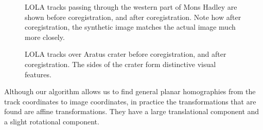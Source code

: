 \documentclass[float=false, crop=false]{standalone}
\begin{document}
\begin{figure}
	\centering
	\caption{LOLA tracks passing through the western part of Mons Hadley are shown
		 before coregistration, and
		 after coregistration. Note how after
		coregistration, the synthetic image matches the actual image much more closely.}
	\label{fig:monshadley}
\end{figure}

\begin{figure}
	\centering
	\caption{LOLA tracks over Aratus crater
		 before coregistration, and
		 after coregistration. The sides of the
		crater form distinctive visual features.}
	\label{fig:aratus}
\end{figure}
Although our algorithm allows us to find general planar homographies from the track coordinates to
image coordinates, in practice the transformations that are found are affine transformations. They
have a large translational component and a slight rotational component.
\end{document}
